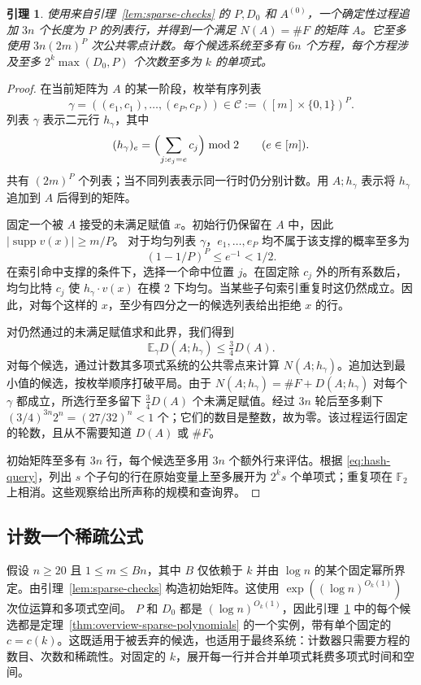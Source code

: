\documentclass[11pt,reqno]{amsart}
\numberwithin{equation}{section}
\newtheorem{lemma}[theorem]{引理}
\theoremstyle{definition}\newtheorem{definition}[theorem]{定义}
\theoremstyle{remark}\newtheorem{remark}[theorem]{注}
\renewcommand{\le}{\leqslant}
\renewcommand{\ge}{\geqslant}
\begin{document}
\begin{lemma}\label{lem:greedy-hashes}
使用来自引理~\ref{lem:sparse-checks} 的 $P,D_0$ 和 $A^{(0)}$，一个确定性过程追加 $3n$ 个长度为 $P$ 的列表行，并得到一个满足 $N(A)=\#F$ 的矩阵 $A$。它至多使用 $3n(2m)^P$ 次公共零点计数。每个候选系统至多有 $6n$ 个方程，每个方程涉及至多 $2^k\max(D_0,P)$ 个次数至多为 $k$ 的单项式。
\end{lemma}
\begin{proof}
在当前矩阵为 $A$ 的某一阶段，枚举有序列表
\[
 \gamma=((e_1,c_1),\ldots,(e_P,c_P))
 \in\mathcal C:=([m]\times\{0,1\})^P.
\]
列表 $\gamma$ 表示二元行 $h_\gamma$，其中
\[
 (h_\gamma)_e=
 \Bigl(\sum_{j:e_j=e}c_j\Bigr)\bmod2
 \qquad(e\in[m]).
\]
共有 $(2m)^P$ 个列表；当不同列表表示同一行时仍分别计数。用 $A;h_\gamma$ 表示将 $h_\gamma$ 追加到 $A$ 后得到的矩阵。

固定一个被 $A$ 接受的未满足赋值 $x$。初始行仍保留在 $A$ 中，因此
$|\operatorname{supp}v(x)|\ge m/P$。
对于均匀列表 $\gamma$，$e_1,\ldots,e_P$ 均不属于该支撑的概率至多为
\[
 (1-1/P)^P\le e^{-1}<1/2.
\]
在索引命中支撑的条件下，选择一个命中位置 $j$。在固定除 $c_j$ 外的所有系数后，均匀比特 $c_j$ 使 $h_\gamma\cdot v(x)$ 在模 $2$ 下均匀。当某些子句索引重复时这仍然成立。因此，对每个这样的 $x$，至少有四分之一的候选列表给出拒绝 $x$ 的行。

对仍然通过的未满足赋值求和此界，我们得到
\[
 \mathbb E_\gamma D(A;h_\gamma)\le\tfrac34 D(A).
\]
对每个候选，通过计数其多项式系统的公共零点来计算 $N(A;h_\gamma)$。追加达到最小值的候选，按枚举顺序打破平局。由于
$N(A;h_\gamma)=\#F+D(A;h_\gamma)$ 对每个 $\gamma$ 都成立，所选行至多留下 $\tfrac34 D(A)$ 个未满足赋值。经过 $3n$ 轮后至多剩下 $(3/4)^{3n}2^n=(27/32)^n<1$ 个；它们的数目是整数，故为零。该过程运行固定的轮数，且从不需要知道 $D(A)$ 或 $\#F$。

初始矩阵至多有 $3n$ 行，每个候选至多用 $3n$ 个额外行来评估。根据 \eqref{eq:hash-query}，列出 $s$ 个子句的行在原始变量上至多展开为 $2^k s$ 个单项式；重复项在 $\mathbb F_2$ 上相消。这些观察给出所声称的规模和查询界。
\end{proof}

\subsection{计数一个稀疏公式}\label{subsec:count-sparse}
假设 $n\ge20$ 且 $1\le m\le Bn$，其中 $B$ 仅依赖于 $k$ 并由 $\log n$ 的某个固定幂所界定。由引理~\ref{lem:sparse-checks} 构造初始矩阵。这使用
$\exp((\log n)^{O_k(1)})$ 次位运算和多项式空间。
$P$ 和 $D_0$ 都是 $(\log n)^{O_k(1)}$，因此引理~\ref{lem:greedy-hashes} 中的每个候选都是定理~\ref{thm:overview-sparse-polynomials} 的一个实例，带有单个固定的
$c=c(k)$。这既适用于被丢弃的候选，也适用于最终系统：计数器只需要方程的数目、次数和稀疏性。对固定的 $k$，展开每一行并合并单项式耗费多项式时间和空间。
\end{document}
